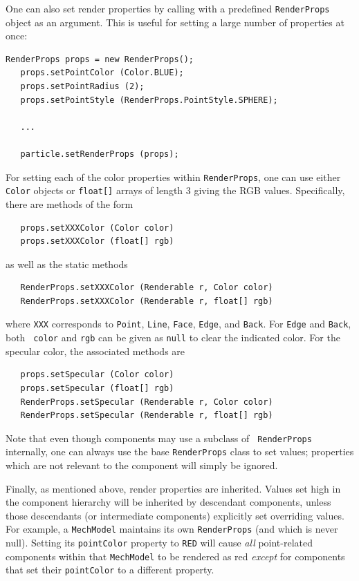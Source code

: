One can also set render properties by calling
 with a
predefined {\tt RenderProps} object as an argument. This is useful for
setting a large number of properties at once:
%
\begin{lstlisting}[]
   RenderProps props = new RenderProps();
   props.setPointColor (Color.BLUE);
   props.setPointRadius (2);
   props.setPointStyle (RenderProps.PointStyle.SPHERE);

   ...

   particle.setRenderProps (props);
\end{lstlisting}

For setting each of the color properties within {\tt RenderProps},
one can use either {\tt Color} objects or {\tt float[]} arrays
of length 3 giving the RGB values. Specifically, there
are methods of the form
%
\begin{lstlisting}
   props.setXXXColor (Color color)
   props.setXXXColor (float[] rgb)
\end{lstlisting}
%
as well as the static methods
%
\begin{lstlisting}
   RenderProps.setXXXColor (Renderable r, Color color)
   RenderProps.setXXXColor (Renderable r, float[] rgb)
\end{lstlisting}
%
where {\tt XXX} corresponds to {\tt Point}, {\tt Line}, {\tt Face},
{\tt Edge}, and {\tt Back}. For {\tt Edge} and {\tt Back}, both {\tt
color} and {\tt rgb} can be given as {\tt null} to clear the indicated
color. For the specular color, the associated methods are
%
\begin{lstlisting}
   props.setSpecular (Color color)
   props.setSpecular (float[] rgb)
   RenderProps.setSpecular (Renderable r, Color color)
   RenderProps.setSpecular (Renderable r, float[] rgb)
\end{lstlisting}
%

\begin{sideblock}
Note that even though components may use a subclass of {\tt
RenderProps} internally, one can always use the base {\tt RenderProps}
class to set values; properties which are not relevant to the
component will simply be ignored.
\end{sideblock}

Finally, as mentioned above, render properties are inherited.  Values
set high in the component hierarchy will be inherited by descendant
components, unless those descendants (or intermediate components)
explicitly set overriding values.  For example, a {\tt MechModel}
maintains its own {\tt RenderProps} (and which is never null). Setting
its {\tt pointColor} property to {\tt RED} will cause {\it all}
point-related components within that {\tt MechModel} to be rendered as
red {\it except} for components that set their {\tt pointColor} to a
different property.

